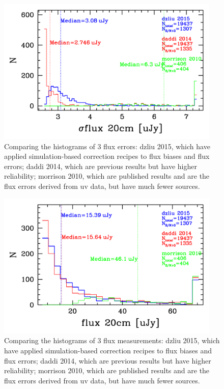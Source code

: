 \documentclass[11pt,a4paper]{article}
\begin{document}
\begin{figure}[H]
	\includegraphics[width=0.95\textwidth]{compare_df20cm_histogram_dzliu_daddi_morrison_20160124}
	\caption{Comparing the histograms of 3 flux errors: dzliu 2015, which have applied simulation-based correction recipes to flux biases and flux errors; daddi 2014, which are previous results but have higher reliability; morrison 2010, which are published results and are the flux errors derived from uv data, but have much fewer sources.}
\end{figure}

\begin{figure}[H]
	\includegraphics[width=0.95\textwidth]{compare_f20cm_histogram_dzliu_daddi_morrison_20160124}
	\caption{Comparing the histograms of 3 flux measurements: dzliu 2015, which have applied simulation-based correction recipes to flux biases and flux errors; daddi 2014, which are previous results but have higher reliability; morrison 2010, which are published results and are the flux errors derived from uv data, but have much fewer sources.}
\end{figure}
\end{document}
